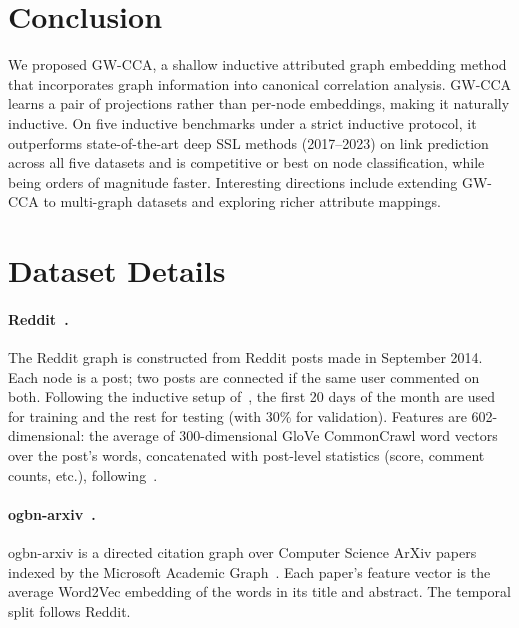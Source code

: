 \documentclass{article}
\begin{document}
\section{Conclusion}
\label{sec:conclusion}

We proposed GW-CCA, a shallow inductive attributed graph embedding method that
incorporates graph information into canonical correlation analysis. GW-CCA
learns a pair of projections rather than per-node embeddings, making it
naturally inductive. On five inductive benchmarks under a strict inductive
protocol, it outperforms state-of-the-art deep SSL methods
(2017--2023) on link prediction across all five datasets and is competitive
or best on node classification, while being orders of magnitude faster. Interesting directions
include extending GW-CCA to multi-graph datasets and exploring richer
attribute mappings.




\appendix

\section{Dataset Details}
\label{app:data}

\paragraph{Reddit~\citep{hamilton2017inductive}.}
The Reddit graph is constructed from Reddit posts made in September 2014.
Each node is a post; two posts are connected if the same user commented on
both. Following the inductive setup of~\citet{hamilton2017inductive}, the
first 20 days of the month are used for training and the rest for testing
(with 30\% for validation). Features are 602-dimensional: the average of
300-dimensional GloVe CommonCrawl word vectors~\citep{rehurek2010software}
over the post's words, concatenated with post-level statistics (score,
comment counts, etc.), following~\citet{hamilton2017inductive}.

\paragraph{ogbn-arxiv~\citep{hu2020open}.}
ogbn-arxiv is a directed citation graph over Computer Science ArXiv papers
indexed by the Microsoft Academic Graph~\citep{wang2020microsoft}. Each
paper's feature vector is the average Word2Vec embedding of the words in its
title and abstract. The temporal split follows Reddit.
\end{document}
